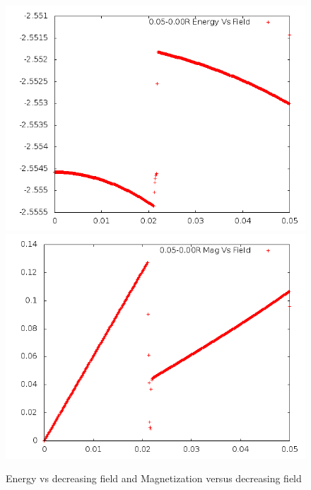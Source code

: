\documentclass{article}
\begin{document}
\begin{figure}[ht]
 \centering 
\includegraphics[scale=0.3]{111_2000/E005to000R.png}
\includegraphics[scale=0.3]{111_2000/M005to000R.png}
\caption{Energy vs decreasing field and Magnetization versus decreasing field}
\end{figure}
\end{document}
